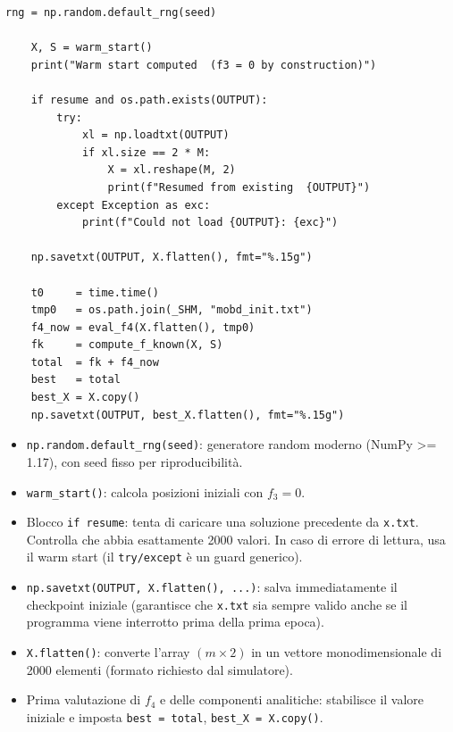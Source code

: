 \documentclass[12pt,a4paper]{article}
\theoremstyle{definition}
\begin{document}
\begin{lstlisting}[caption={Righe 230–256 — Inizializzazione e prima valutazione}]
    rng = np.random.default_rng(seed)

    X, S = warm_start()
    print("Warm start computed  (f3 = 0 by construction)")

    if resume and os.path.exists(OUTPUT):
        try:
            xl = np.loadtxt(OUTPUT)
            if xl.size == 2 * M:
                X = xl.reshape(M, 2)
                print(f"Resumed from existing  {OUTPUT}")
        except Exception as exc:
            print(f"Could not load {OUTPUT}: {exc}")

    np.savetxt(OUTPUT, X.flatten(), fmt="%.15g")

    t0     = time.time()
    tmp0   = os.path.join(_SHM, "mobd_init.txt")
    f4_now = eval_f4(X.flatten(), tmp0)
    fk     = compute_f_known(X, S)
    total  = fk + f4_now
    best   = total
    best_X = X.copy()
    np.savetxt(OUTPUT, best_X.flatten(), fmt="%.15g")
\end{lstlisting}

\begin{itemize}[nosep]
  \item \texttt{np.random.default\_rng(seed)}: generatore random moderno (NumPy >= 1.17),
        con seed fisso per riproducibilità.
  \item \texttt{warm\_start()}: calcola posizioni iniziali con $f_3 = 0$.
  \item Blocco \texttt{if resume}: tenta di caricare una soluzione precedente da \texttt{x.txt}.
        Controlla che abbia esattamente 2000 valori. In caso di errore di lettura,
        usa il warm start (il \texttt{try/except} è un guard generico).
  \item \texttt{np.savetxt(OUTPUT, X.flatten(), ...)}: salva immediatamente il checkpoint
        iniziale (garantisce che \texttt{x.txt} sia sempre valido anche se il programma
        viene interrotto prima della prima epoca).
  \item \texttt{X.flatten()}: converte l'array $(m \times 2)$ in un vettore monodimensionale
        di 2000 elementi (formato richiesto dal simulatore).
  \item Prima valutazione di $f_4$ e delle componenti analitiche: stabilisce il valore iniziale
        e imposta \texttt{best = total}, \texttt{best\_X = X.copy()}.
\end{itemize}
\end{document}

